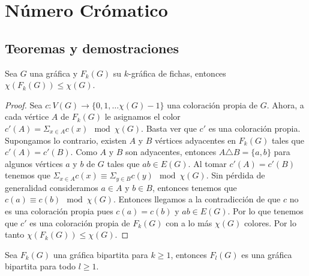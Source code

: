 \chapter{N\'umero Cr\'omatico}%
\label{cap:num cromatico}

\section{Teoremas y demostraciones}%


\begin{teorema}
\label{teo:num cromatico de G y F(G)}
    Sea $G$ una gr\'afica y $F_k(G)$ su $k$-gr\'afica de fichas, entonces
    $\chi(F_k(G)) \leq \chi (G)$.
\end{teorema}

\begin{proof}
    Sea $c: V(G) \rightarrow \{0,1, \dots \chi(G)-1\}$ una coloraci\'on propia
    de $G$. Ahora, a cada v\'ertice $A$ de $F_k(G)$ le asignamos el color $
    c'(A)= \Sigma_{x \in A}c(x) \mod \chi(G)$. Basta ver que $c'$ es una
    coloraci\'on propia. Supongamos lo contrario, existen $A$ y $B$ v\'ertices
    adyacentes en $F_k(G)$ tales que $c'(A) = c'(B)$. Como $A$ y $B$ son
    adyacentes, entonces $A \triangle B = \{a,b\}$ para algunos v\'ertices $a$ y
    $b$ de $G$ tales que $ab \in E(G)$. Al tomar $c'(A) = c'(B)$ tenemos que
    $\Sigma_{x \in A}c(x) \equiv \Sigma_{y \in B}c(y) \mod \chi(G)$. Sin
    p\'erdida de generalidad consideramos $a \in A$ y $b \in B$, entonces
    tenemos que $c(a) \equiv c(b) \mod \chi(G)$. Entonces llegamos a la
    contradicci\'on de que $c$ no es una coloraci\'on propia pues $c(a) = c(b)$
    y $ab \in E(G)$. Por lo que tenemos que $c'$ es una coloraci\'on propia de
    $F_k(G)$ con a lo m\'as $\chi (G)$ colores. Por lo tanto $\chi(F_k(G)) \leq
    \chi (G)$.
\end{proof}

\begin{proposicion}
\label{prop:biparticion F(G)}
    Sea $F_k(G)$ una gr\'afica bipartita para $k \geq 1$, entonces $F_l(G)$
    es una gr\'afica bipartita para todo $l \geq 1$.
\end{proposicion}


